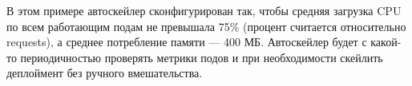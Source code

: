 \documentclass[%
	11pt,
	a4paper,
	utf8,
		]{article}
\begin{document}
В этом примере автоскейлер сконфигурирован так, чтобы средняя загрузка CPU по всем работающим подам не превышала 75\% (процент считается относительно requests), а среднее потребление памяти — 400 МБ. Автоскейлер будет с какой-то периодичностью проверять метрики подов и при необходимости скейлить деплоймент без ручного вмешательства.











\begin{thebibliography}{99}
\end{thebibliography}


\lstlistoflistings{}
\end{document}
